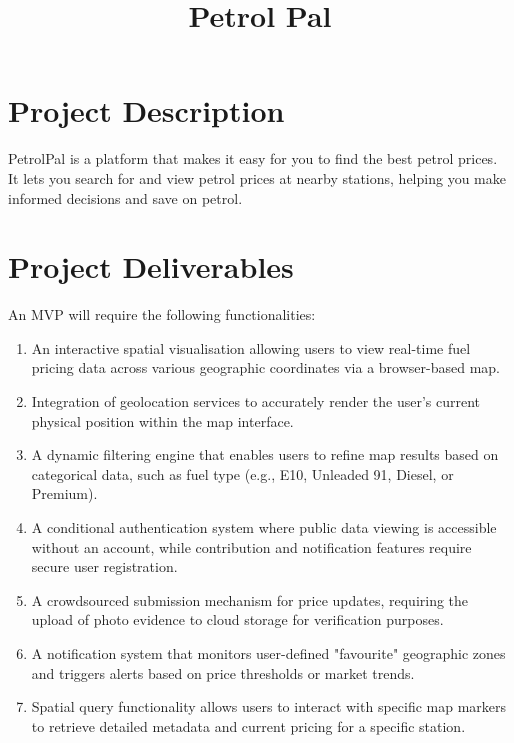 \title{Petrol Pal}

\maketitle
\section*{Project Description}
PetrolPal is a platform that makes it easy for you to find the best petrol prices. 
It lets you search for and view petrol prices at nearby stations, helping you make informed decisions and save on petrol.

\section*{Project Deliverables}
An MVP will require the following functionalities:
\begin{enumerate}
\item An interactive spatial visualisation allowing users to view real-time fuel pricing data across various geographic coordinates via a browser-based map. 
\item Integration of geolocation services to accurately render the user's current physical position within the map interface. 
\item A dynamic filtering engine that enables users to refine map results based on categorical data, such as fuel type (e.g., E10, Unleaded 91, Diesel, or Premium). 
\item A conditional authentication system where public data viewing is accessible without an account, while contribution and notification features require secure user registration. 
\item A crowdsourced submission mechanism for price updates, requiring the upload of photo evidence to cloud storage for verification purposes. 
\item A notification system that monitors user-defined "favourite" geographic zones and triggers alerts based on price thresholds or market trends. 
\item Spatial query functionality allows users to interact with specific map markers to retrieve detailed metadata and current pricing for a specific station.
\end{enumerate}

